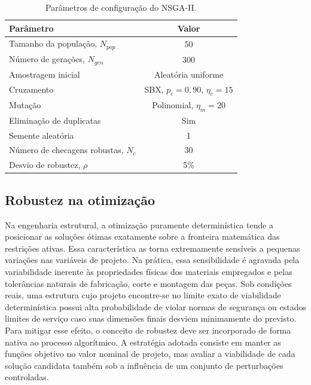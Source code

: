 \begin{table}[!ht]
\caption{Parâmetros de configuração do NSGA-II.\label{tab:nsga2}}
\begin{tabular*}{\columnwidth}{@{\extracolsep\fill}lc@{\extracolsep\fill}}
\toprule
Parâmetro & Valor \\
\midrule
Tamanho da população, $N_{pop}$ & 50 \\
Número de gerações, $N_{gen}$ & 300 \\
Amostragem inicial & Aleatória uniforme \\
Cruzamento & SBX, $p_c = 0{,}90$, $\eta_c = 15$ \\
Mutação & Polinomial, $\eta_m = 20$ \\
Eliminação de duplicatas & Sim \\
Semente aleatória & 1 \\
Número de checagens robustas, $N_c$ & 30 \\
Desvio de robustez, $\rho$ & 5\% \\
\bottomrule
\end{tabular*}
\end{table}
 
 \subsection{Robustez na otimização}\label{sec:robustez}
 
Na engenharia estrutural, a otimização puramente determinística tende a posicionar as soluções ótimas exatamente sobre a fronteira matemática das restrições ativas.
Essa característica as torna extremamente sensíveis a pequenas variações nas variáveis de projeto.
Na prática, essa sensibilidade é agravada pela variabilidade inerente às propriedades físicas dos materiais empregados e pelas tolerâncias naturais de fabricação, corte e montagem das peças.
Sob condições reais, uma estrutura cujo projeto encontre-se no limite exato de viabilidade determinística possui alta probabilidade de violar normas de segurança ou estados limites de serviço caso suas dimensões finais desviem minimamente do previsto.
Para mitigar esse efeito, o conceito de robustez deve ser incorporado de forma nativa ao processo algorítmico.
A estratégia adotada consiste em manter as funções objetivo no valor nominal de projeto, mas avaliar a viabilidade de cada solução candidata também sob a influência de um conjunto de perturbações controladas.

